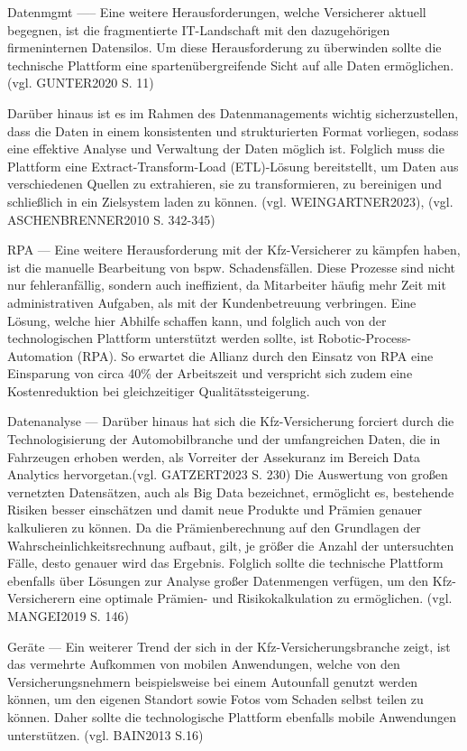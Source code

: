 Datenmgmt ----- Eine weitere Herausforderungen, welche Versicherer aktuell begegnen, ist die fragmentierte IT-Landschaft mit den dazugehörigen firmeninternen Datensilos. Um diese Herausforderung zu überwinden sollte die technische Plattform eine spartenübergreifende Sicht auf alle Daten ermöglichen. (vgl. GUNTER2020 S. 11)

Darüber hinaus ist es im Rahmen des Datenmanagements wichtig sicherzustellen, dass die Daten in einem konsistenten und strukturierten Format vorliegen, sodass eine effektive Analyse und Verwaltung der Daten möglich ist. Folglich muss die Plattform eine Extract-Transform-Load (ETL)-Lösung bereitstellt, um Daten aus verschiedenen Quellen zu extrahieren, sie zu transformieren, zu bereinigen und schließlich in ein Zielsystem laden zu können. (vgl. WEINGARTNER2023), (vgl. ASCHENBRENNER2010 S. 342-345)


RPA --- Eine  weitere Herausforderung mit der Kfz-Versicherer zu kämpfen haben, ist die manuelle Bearbeitung von bspw. Schadensfällen. Diese Prozesse sind nicht nur fehleranfällig, sondern auch ineffizient, da Mitarbeiter häufig mehr Zeit mit administrativen Aufgaben, als mit der Kundenbetreuung verbringen. Eine Lösung, welche hier Abhilfe schaffen kann, und folglich auch von der technologischen Plattform unterstützt werden sollte, ist Robotic-Process-Automation (RPA). So erwartet die Allianz durch den Einsatz von RPA eine Einsparung von circa 40\% der Arbeitszeit und verspricht sich zudem eine Kostenreduktion bei gleichzeitiger Qualitätssteigerung. 

Datenanalyse --- Darüber hinaus hat sich die Kfz-Versicherung forciert durch die Technologisierung der Automobilbranche und der umfangreichen Daten, die in Fahrzeugen erhoben werden, als Vorreiter der Assekuranz im Bereich Data Analytics hervorgetan.(vgl. GATZERT2023 S. 230) Die Auswertung von großen vernetzten Datensätzen, auch als Big Data bezeichnet, ermöglicht es, bestehende Risiken besser einschätzen und damit neue Produkte und Prämien genauer kalkulieren zu können. Da die Prämienberechnung auf den Grundlagen der Wahrscheinlichkeitsrechnung aufbaut, gilt, je größer die Anzahl der untersuchten Fälle, desto genauer wird das Ergebnis. Folglich sollte die technische Plattform ebenfalls über Lösungen zur Analyse großer Datenmengen verfügen, um den Kfz-Versicherern eine optimale Prämien- und Risikokalkulation zu ermöglichen. (vgl. MANGEI2019 S. 146)

Geräte --- Ein weiterer Trend der sich in der Kfz-Versicherungsbranche zeigt, ist das vermehrte Aufkommen von mobilen Anwendungen, welche von den Versicherungsnehmern beispielsweise bei einem Autounfall genutzt werden können, um den eigenen Standort sowie Fotos vom Schaden selbst teilen zu können. Daher sollte die technologische Plattform ebenfalls mobile Anwendungen unterstützen. (vgl. BAIN2013 S.16)

